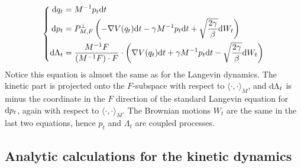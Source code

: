 \begin{equation}
    \label{eq:norton_final_sde}
    \left\{\begin{aligned}
        \mathrm{d} q_t &= M^{-1}p_t\mathrm{d} t\\
        \mathrm{d} p_t &= P_{M,F}^\perp\left(-\nabla V(q_t)\mathrm{d} t -\gamma M^{-1}p_t\mathrm{d} t +\sqrt{\frac{2\gamma}\beta}\mathrm{d} W_t\right)\\
        \mathrm{d} \Lambda_t &=\frac{M^{-1}F}{\left(M^{-1}F\right)\cdot F}\cdot\left(\nabla V(q_t)\mathrm{d} t +\gamma M^{-1}p_t\mathrm{d} t-\sqrt{\frac{2\gamma}\beta}\mathrm{d} W_t\right)
    \end{aligned}\right.
\end{equation}
Notice this equation is almost the same as for the Langevin dynamics.
The kinetic part is projected onto the $F$-subspace with respect to $\langle \cdot,\cdot\rangle_M$, and $\mathrm{d}\Lambda_t$ is minus the coordinate in the $F$ direction of the standard Langevin equation for $\mathrm{d} p_t$, again with respect to $\langle \cdot ,\cdot \rangle_M$.
The Brownian motions $W_t$ are the same in the last two equations, hence $p_t$ and $\Lambda_t$ are coupled processes.

\subsection{Analytic calculations for the kinetic dynamics}


